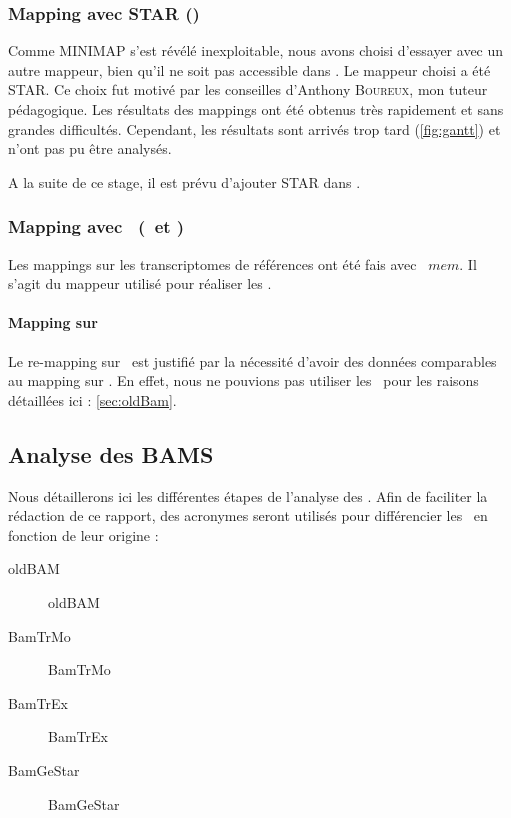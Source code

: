 \documentclass[../main]{subfiles} %
\begin{document}
\subsubsection{Mapping avec \gls{STAR} (\GeMo)}
\label{sec:Star}
Comme \gls{MINIMAP} s’est révélé inexploitable, nous avons choisi d’essayer avec un autre \gls{mappeur}, bien qu’il ne soit pas accessible dans \GeCKO. Le \gls{mappeur} choisi a été \gls{STAR}. Ce choix fut motivé par les conseilles d'Anthony \textsc{Boureux}, mon tuteur pédagogique. Les résultats des \glspl{mapping} ont été obtenus très rapidement et sans grandes difficultés. Cependant, les résultats sont arrivés trop tard (\cref{fig:gantt}) et n'ont pas pu être analysés. 

A la suite de ce stage, il est prévu d'ajouter \gls{STAR} dans \GeCKO.

\subsubsection{Mapping avec \BWA (\TrEx et \TrMo)}
Les \glspl{mapping} sur les \glspl{transcriptome} de références ont été fais avec \BWA $mem$. Il s’agit du \gls{mappeur} utilisé pour réaliser les \OldBam.

\paragraph{Mapping sur \TrEx} Le re-mapping sur \TrEx est justifié par la nécessité d'avoir des données comparables au \gls{mapping} sur \TrMo. En effet, nous ne pouvions pas utiliser les \OldBam pour les raisons détaillées ici : \ref{sec:oldBam}. 

\subsection{Analyse des BAMS}
Nous détaillerons ici les différentes étapes de l'analyse des \bam.
Afin de faciliter la rédaction de ce rapport, des acronymes seront utilisés pour différencier les \bam en fonction de leur origine :
\begin{description}
    \item [\acrshort{oldBAM}] \acrlong{oldBAM}
    \item [\acrshort{BamTrMo}] \acrlong{BamTrMo}
    \item [\acrshort{BamTrEx}] \acrlong{BamTrEx}
    \item [\acrshort{BamGeStar}] \acrlong{BamGeStar}
\end{description}
\end{document}
